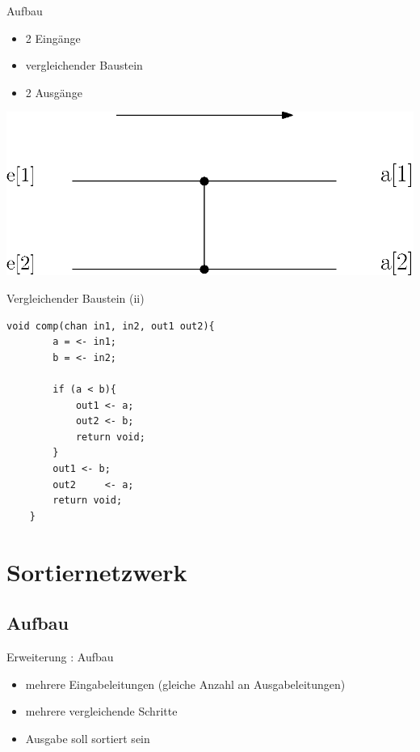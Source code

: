 \documentclass[ucs,9pt]{beamer}
\begin{document}
\begin{frame}{Aufbau}
    \begin{minipage}[c]{14.5cm}
    		\begin{minipage}[c]{5cm}
        		\begin{itemize}
            		\item 2 Eingänge
	            	\item vergleichender Baustein
    		        	\item 2 Ausgänge
        		\end{itemize}
	    \end{minipage}
		\begin{minipage}[c]{5cm}
			\includegraphics[scale=0.5]{Komparator1.eps}
	 	\end{minipage}
    \end{minipage}
\end{frame}

\begin{frame}[fragile]{Vergleichender Baustein (ii)}
\begin{lstlisting}[laguage={inform},tabsize=4]
    void comp(chan in1, in2, out1 out2){
        a = <- in1;
        b = <- in2;
        
        if (a < b){
            out1 <- a;
            out2 <- b;
            return void;
        }
        out1 <- b;
        out2	 <- a;
        return void;
    }
\end{lstlisting}
\end{frame}

\section{Sortiernetzwerk}
\subsection{Aufbau}

\begin{frame}{Erweiterung : Aufbau}
    \begin{itemize}
        \item mehrere Eingabeleitungen (gleiche Anzahl an Ausgabeleitungen)
        \item mehrere vergleichende Schritte
        \item Ausgabe soll sortiert sein
    \end{itemize}
\end{frame}
\end{document}

